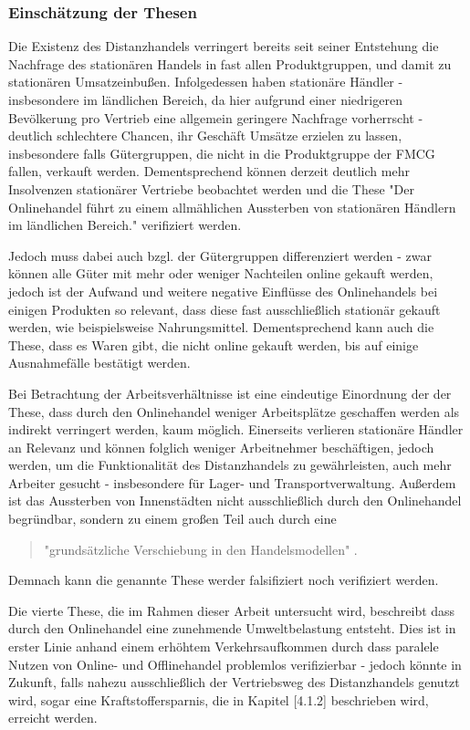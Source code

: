  
\subsubsection{Einschätzung der Thesen}

Die Existenz des Distanzhandels verringert bereits seit seiner Entstehung die Nachfrage des stationären Handels in fast allen Produktgruppen, und damit zu stationären Umsatzeinbußen. Infolgedessen haben stationäre Händler - insbesondere im ländlichen Bereich, da hier aufgrund einer niedrigeren Bevölkerung pro Vertrieb eine allgemein geringere Nachfrage vorherrscht - deutlich schlechtere Chancen, ihr Geschäft Umsätze erzielen zu lassen, insbesondere falls Gütergruppen, die nicht in die Produktgruppe der \ac{FMCG} fallen, verkauft werden. Dementsprechend können derzeit deutlich mehr Insolvenzen stationärer Vertriebe beobachtet werden und die These "Der Onlinehandel führt zu einem allmählichen Aussterben von stationären Händlern im ländlichen Bereich." verifiziert werden.

Jedoch muss dabei auch bzgl. der Gütergruppen differenziert werden - zwar können alle Güter mit mehr oder weniger Nachteilen online gekauft werden, jedoch ist der Aufwand und weitere negative Einflüsse des Onlinehandels bei einigen Produkten so relevant, dass diese fast ausschließlich stationär gekauft werden, wie beispielsweise Nahrungsmittel. Dementsprechend kann auch die These, dass es Waren gibt, die nicht online gekauft werden, bis auf einige Ausnahmefälle bestätigt werden.

Bei Betrachtung der Arbeitsverhältnisse ist eine eindeutige Einordnung der der These, dass durch den Onlinehandel weniger Arbeitsplätze geschaffen werden als indirekt verringert werden, kaum möglich. Einerseits verlieren stationäre Händler an Relevanz und können folglich weniger Arbeitnehmer beschäftigen, jedoch werden, um die Funktionalität des Distanzhandels zu gewährleisten, auch mehr Arbeiter gesucht - insbesondere für Lager- und Transportverwaltung. Außerdem ist das Aussterben von Innenstädten nicht ausschließlich durch den Onlinehandel begründbar, sondern zu einem großen Teil auch durch eine 
\begin{quote}
"grundsätzliche Verschiebung in den Handelsmodellen" \cite[S. 24]{evilcom}.
\end{quote}
Demnach kann die genannte These werder falsifiziert noch verifiziert werden.

Die vierte These, die im Rahmen dieser Arbeit untersucht wird, beschreibt dass durch den Onlinehandel eine zunehmende Umweltbelastung entsteht. Dies ist in erster Linie anhand einem erhöhtem Verkehrsaufkommen durch dass paralele Nutzen von Online- und Offlinehandel problemlos verifizierbar - jedoch könnte in Zukunft, falls nahezu ausschließlich der Vertriebsweg des Distanzhandels genutzt wird, sogar eine Kraftstoffersparnis, die in Kapitel [4.1.2] beschrieben wird, erreicht werden.
